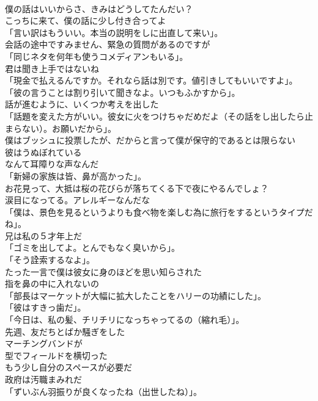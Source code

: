 \documentclass[8pt]{extreport}
\begin{document}
\begin{CJK}{UTF8}{min}
\\	僕の話はいいからさ、きみはどうしてたんだい？	
\\	こっちに来て、僕の話に少し付き合ってよ	
\\	「言い訳はもういい。本当の説明をしに出直して来い」。	
\\	会話の途中ですみません、緊急の質問があるのですが	
\\	「同じネタを何年も使うコメディアンもいる」。	
\\	君は聞き上手ではないね	
\\	「現金で払えるんですか。それなら話は別です。値引きしてもいいですよ」。	
\\	「彼の言うことは割り引いて聞きなよ。いつもふかすから」。	
\\	話が進むように、いくつか考えを出した	
\\	「話題を変えた方がいい。彼女に火をつけちゃだめだよ（その話をし出したら止まらない）。お願いだから」。	
\\	僕はブッシュに投票したが、だからと言って僕が保守的であるとは限らない	
\\	彼はうぬぼれている	
\\	なんて耳障りな声なんだ	
\\	「新婦の家族は皆、鼻が高かった」。	
\\	お花見って、大抵は桜の花びらが落ちてくる下で夜にやるんでしょ？	
\\	涙目になってる。アレルギーなんだな	
\\	「僕は、景色を見るというよりも食べ物を楽しむ為に旅行をするというタイプだね」。	
\\	兄は私の５才年上だ	
\\	「ゴミを出してよ。とんでもなく臭いから」。	
\\	「そう詮索するなよ」。	
\\	たった一言で僕は彼女に身のほどを思い知らされた	
\\	指を鼻の中に入れないの	
\\	「部長はマーケットが大幅に拡大したことをハリーの功績にした」。	
\\	「彼はすきっ歯だ」。	
\\	「今日は、私の髪、チリチリになっちゃってるの（縮れ毛）」。	
\\	先週、友だちとばか騒ぎをした	
\\	マーチングバンドが
\\	型でフィールドを横切った	
\\	もう少し自分のスペースが必要だ	
\\	政府は汚職まみれだ	
\\	「ずいぶん羽振りが良くなったね（出世したね）」。	

\end{CJK}
\end{document}
